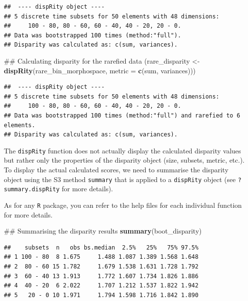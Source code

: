 \documentclass[]{book}
\newenvironment{Shaded}{\begin{snugshade}}{\end{snugshade}}
\newcommand{\KeywordTok}[1]{\textcolor[rgb]{0.13,0.29,0.53}{\textbf{#1}}}
\newcommand{\DataTypeTok}[1]{\textcolor[rgb]{0.13,0.29,0.53}{#1}}
\newcommand{\StringTok}[1]{\textcolor[rgb]{0.31,0.60,0.02}{#1}}
\newcommand{\NormalTok}[1]{#1}
\theoremstyle{definition}
\theoremstyle{definition}
\theoremstyle{definition}
\theoremstyle{remark}
\begin{document}
\begin{verbatim}
##  ---- dispRity object ---- 
## 5 discrete time subsets for 50 elements with 48 dimensions:
##     100 - 80, 80 - 60, 60 - 40, 40 - 20, 20 - 0.
## Data was bootstrapped 100 times (method:"full").
## Disparity was calculated as: c(sum, variances).
\end{verbatim}

\begin{Shaded}
\begin{Highlighting}[]
\NormalTok{## Calculating disparity for the rarefied data}
\NormalTok{(rare_disparity <-}\StringTok{ }\KeywordTok{dispRity}\NormalTok{(rare_bin_morphospace, }\DataTypeTok{metric =} \KeywordTok{c}\NormalTok{(sum, variances)))}
\end{Highlighting}
\end{Shaded}

\begin{verbatim}
##  ---- dispRity object ---- 
## 5 discrete time subsets for 50 elements with 48 dimensions:
##     100 - 80, 80 - 60, 60 - 40, 40 - 20, 20 - 0.
## Data was bootstrapped 100 times (method:"full") and rarefied to 6 elements.
## Disparity was calculated as: c(sum, variances).
\end{verbatim}

The \texttt{dispRity} function does not actually display the calculated
disparity values but rather only the properties of the disparity object
(size, subsets, metric, etc.). To display the actual calculated scores,
we need to summarise the disparity object using the S3 method
\texttt{summary} that is applied to a \texttt{dispRity} object (see
\texttt{?summary.dispRity} for more details).

As for any \texttt{R} package, you can refer to the help files for each
individual function for more details.

\begin{Shaded}
\begin{Highlighting}[]
\NormalTok{## Summarising the disparity results}
\KeywordTok{summary}\NormalTok{(boot_disparity)}
\end{Highlighting}
\end{Shaded}

\begin{verbatim}
##    subsets  n   obs bs.median  2.5%   25%   75% 97.5%
## 1 100 - 80  8 1.675     1.488 1.087 1.389 1.568 1.648
## 2  80 - 60 15 1.782     1.679 1.538 1.631 1.728 1.792
## 3  60 - 40 13 1.913     1.772 1.607 1.734 1.826 1.886
## 4  40 - 20  6 2.022     1.707 1.212 1.537 1.822 1.942
## 5   20 - 0 10 1.971     1.794 1.598 1.716 1.842 1.890
\end{verbatim}
\end{document}
